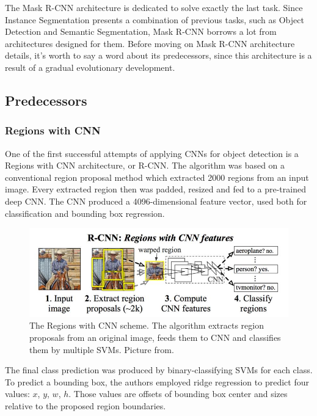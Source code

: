 \documentclass[thesis=B,english]{FITthesis}[2019/12/23]
\begin{document}
The Mask R-CNN architecture is dedicated to solve exactly the last task. Since Instance Segmentation presents a combination of previous tasks, such as Object Detection and Semantic Segmentation, Mask R-CNN borrows a lot from architectures designed for them. Before moving on Mask R-CNN architecture details, it's worth to say a word about its predecessors, since this architecture is a result of a gradual evolutionary development.

\subsection{Predecessors}

\subsubsection{Regions with CNN}

One of the first successful attempts of applying CNNs for object detection is a Regions with CNN\cite{rcnn} architecture, or R-CNN. The algorithm was based on a conventional region proposal method which extracted 2000 regions from an input image. Every extracted region then was padded, resized and fed to a pre-trained deep CNN. The CNN produced a 4096-dimensional feature vector, used both for classification and bounding box regression.

\begin{figure}[h]
	\centering
	\includegraphics[scale=0.5]{images/rcnn.jpeg}
	\caption{The Regions with CNN scheme. The algorithm extracts region proposals from an original image, feeds them to CNN and classifies them by multiple SVMs. Picture from\cite{rcnn}.}
\end{figure}

The final class prediction was produced by binary-classifying SVMs for each class. To predict a bounding box, the authors employed ridge regression to predict four values: $x$, $y$, $w$, $h$. Those values are offsets of bounding box center and sizes relative to the proposed region boundaries.
\end{document}
